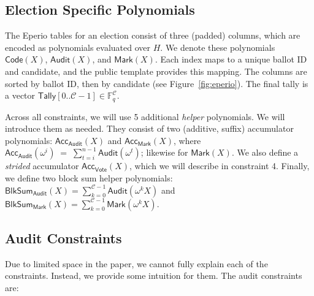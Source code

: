 \subsection{Election Specific Polynomials}

The Eperio tables for an election consist of three (padded) columns, which are encoded as polynomials evaluated over $H$. We denote these polynomials $\mathsf{Code}(X)$, $\mathsf{Audit}(X)$, and $\mathsf{Mark}(X)$. Each index maps to a unique ballot ID and candidate, and the public template provides this mapping. The columns are sorted by ballot ID, then by candidate (see Figure~\ref{fig:eperio}). The final tally is a vector $\mathsf{Tally}[0..\mathcal{C}-1]\in\mathbb{F}_q^{\mathcal{C}}$.

Across all constraints, we will use 5 additional \emph{helper} polynomials. We will introduce them as needed. They consist of two (additive, suffix) accumulator polynomials: $\mathsf{Acc}_{\mathsf{Audit}}(X)$ and $\mathsf{Acc}_{\mathsf{Mark}}(X)$, where $\mathsf{Acc}_{\mathsf{Audit}}(\omega^{i}) \;=\; \sum_{t=i}^{n-1} \mathsf{Audit}(\omega^{t})$; likewise for $\mathsf{Mark}(X)$. We also define a \emph{strided} accumulator $\mathsf{Acc}_{\mathsf{Vote}}(X)$, which we will describe in constraint 4. Finally, we define two block sum helper polynomials: $\mathsf{BlkSum}_{\mathsf{Audit}}(X)=\sum_{k=0}^{\mathcal{C}-1}\mathsf{Audit}(\omega^k X)$ and $\mathsf{BlkSum}_{\mathsf{Mark}}(X)=\sum_{k=0}^{\mathcal{C}-1}\mathsf{Mark}(\omega^k X)$.

%

\subsection{Audit Constraints}
\label{sec:audit}

Due to limited space in the paper, we cannot fully explain each of the \constraints constraints. Instead, we provide some intuition for them. The audit constraints are:

